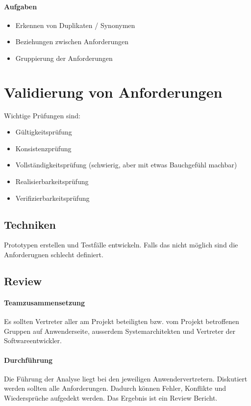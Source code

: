 
\paragraph{Aufgaben}

\begin{itemize}
\item Erkennen von Duplikaten / Synonymen 
\item Beziehungen zwischen Anforderungen 
\item Gruppierung der Anforderungen 
\end{itemize}

\section{Validierung von Anforderungen}
Wichtige Prüfungen sind:

\begin{itemize}
\item Gültigkeitsprüfung
\item Konsistenzprüfung
\item Vollständigkeitsprüfung (schwierig, aber mit etwas Bauchgefühl machbar)
\item Realisierbarkeitsprüfung
\item Verifizierbarkeitsprüfung
\end{itemize}

\subsection{Techniken}
Prototypen erstellen und Testfälle entwickeln. Falls das nicht möglich sind die Anforderugnen schlecht definiert.

\subsection{Review}
\paragraph{Teamzusammensetzung}
Es sollten Vertreter aller am Projekt beteiligten bzw. vom Projekt betroffenen Gruppen auf Anwenderseite, ausserdem Systemarchitekten und Vertreter der Softwareentwickler.

\paragraph{Durchführung}
Die Führung der Analyse liegt bei den jeweiligen Anwendervertretern. Diskutiert werden sollten alle Anforderungen. Dadurch können Fehler, Konflikte und Wiedersprüche aufgedekt werden. Das Ergebnis ist ein Review Bericht.


